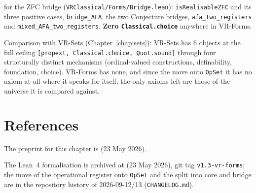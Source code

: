  for the ZFC bridge
(\texttt{VRClassical/Forms/Bridge.lean}): \texttt{isRealisableZFC} and its
three positive cases, \texttt{bridge\_AFA}, the two Conjecture bridges,
\texttt{afa\_two\_registers} and \texttt{mixed\_AFA\_two\_registers}.
\textbf{Zero \texttt{Classical.choice}} anywhere in VR-Forms.

Comparison with VR-Sets (Chapter~\ref{chap:sets}): VR-Sets has 6 objects at
the full ceiling \texttt{[propext, Classical.choice, Quot.sound]} through
four structurally distinct mechanisms (ordinal-valued constructions,
definability, foundation, choice).  VR-Forms has none, and since the move
onto \texttt{OpSet} it has no axiom at all where it speaks for itself; the
only axioms left are those of the universe it is compared against.

\section{References}
\label{sec:forms_refs}

The preprint for this chapter is
 (23 May 2026).

The Lean~4 formalisation is archived at
 (23 May 2026),
git tag \texttt{v1.3-vr-forms}; the move of the operational register onto
\texttt{OpSet} and the split into core and bridge are in the repository
history of 2026-09-12/13 (\texttt{CHANGELOG.md}).
